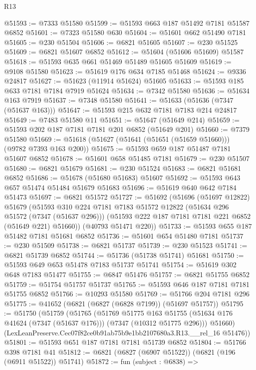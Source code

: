 \begin{lexlean}{R13}
\begin{coremodule}
@51593 := @7333 @51580
@51599 := @51593 @663 @187 @51492 @7181 @51587 @6852
@51601 := @7323 @51580 @630
@51604 := @51601 @662 @51490 @7181
@51605 := @230 @51504
@51606 := @6821 @51605
@51607 := @230 @51525
@51609 := @6821 @51607 @6852
@51612 := @51604 (@51606 @51609) @51587
@51618 := @51593 @635 @661 @51469 @51489 @51605 @51609
@51619 := @9108 @51580
@51623 := @51619 @176 @634 @7185 @51468
@51624 := @9336 @24817
@51627 := @51623 (@11914 @51624) @51605
@51633 := @51593 @185 @633 @7181 @7184 @7919 @51624
@51634 := @7342 @51580
@51636 := @51634 @163 @7919
@51637 := @7348 @51580
@51641 := @51633 (@51636 (@7347 (@51637 @163)))
@51647 := @51593 @215 @632 @7181 @7183 @214 @24817
@51649 := @7483 @51580 @11
@51651 := @51647 (@51649 @214)
@51659 := @51593 @202 @187 @7181 @7181 @201 @6852 (@51649 @201)
@51660 := @7379 @51580
@51669 := @51618 (@51627 (@51641 (@51651 (@51659 @51660))) (@9782 @7393 @163 @200))
@51675 := @51593 @659 @187 @51487 @7181 @51607 @6852
@51678 := @51601 @658 @51485 @7181
@51679 := @230 @51507
@51680 := @6821 @51679
@51681 := @230 @51524
@51683 := @6821 @51681 @6852
@51686 := @51678 (@51680 @51683) @51607
@51692 := @51593 @643 @657 @51474 @51484 @51679 @51683
@51696 := @51619 @640 @642 @7184 @51473
@51697 := @6821 @51572
@51727 := @51692
    (@51696
      (@51697 @12822)
      @51679
      (@51593
        @310
        @224
        @7181
        @7183
        @51572
        @12822
        (@51634 @296 @51572 (@7347 (@51637 @296)))
        (@51593 @222 @187 @7181 @7181 @221 @6852 (@51649 @221) @51660))
      (@40793 @51471 @220))
@51733 := @51593 @655 @187 @51482 @7181 @51681 @6852
@51736 := @51601 @654 @51480 @7181
@51737 := @230 @51509
@51738 := @6821 @51737
@51739 := @230 @51523
@51741 := @6821 @51739 @6852
@51744 := @51736 (@51738 @51741) @51681
@51750 := @51593 @649 @653 @51478 @7183 @51737 @51741
@51754 := @51619 @302 @648 @7183 @51477
@51755 := @6847 @51476
@51757 := @6821 @51755 @6852
@51759 := @51754 @51757 @51737
@51765 := @51593 @646 @187 @7181 @7181 @51755 @6852
@51766 := @10293 @51580
@51769 := @51766 @204 @7181 @296
@51775 := @41652 (@6821 (@6827 (@6828 @7199)) (@51697 @51757))
@51795 := @51750
    (@51759
      (@51765
        (@51769
          @51775
          @163
          @51755
          (@51634 @176 @41624 (@7347 (@51637 @176)))
          (@7347 (@10312 @51775 @296)))
        @51660)
      (LexLeanPreserve.Cec07f82ce0b91ab75b9e1bb2107680a3.R13.__rel_16 @51476))
@51801 := @51593 @651 @187 @7181 @7181 @51739 @6852
@51804 := @51766 @398 @7181 @41
@51812 := @6821 (@6827 (@6907 @51522)) (@6821 (@196 (@6911 @51522)) @51741)
@51872 := fun (subject : @6838) =>

\end{coremodule}
\end{lexlean}
